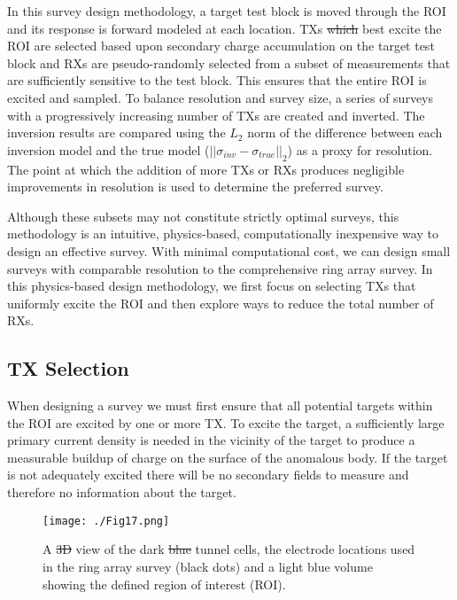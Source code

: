 \documentclass[preprint,authoryear,12pt]{elsarticle}
\providecommand{\DIFaddtex}[1]{{\protect\color{blue}\uwave{#1}}} %
\providecommand{\DIFdeltex}[1]{{\protect\color{red}\sout{#1}}}                      %
\providecommand{\DIFaddbegin}{} %
\providecommand{\DIFaddend}{} %
\providecommand{\DIFdelbegin}{} %
\providecommand{\DIFdelend}{} %
\providecommand{\DIFaddFL}[1]{\DIFadd{#1}} %
\providecommand{\DIFdelFL}[1]{\DIFdel{#1}} %
\providecommand{\DIFaddbeginFL}{} %
\providecommand{\DIFaddendFL}{} %
\providecommand{\DIFdelbeginFL}{} %
\providecommand{\DIFdelendFL}{} %
\providecommand{\DIFadd}[1]{\texorpdfstring{\DIFaddtex{#1}}{#1}} %
\providecommand{\DIFdel}[1]{\texorpdfstring{\DIFdeltex{#1}}{}} %
\begin{document}
In this survey design methodology, a target test block is moved through the ROI and its response is forward modeled at each location. TXs \DIFdelbegin \DIFdel{which }\DIFdelend \DIFaddbegin \DIFadd{that }\DIFaddend best excite the ROI are selected based upon secondary charge accumulation on the target test block and RXs are pseudo-randomly selected from a subset of measurements that are sufficiently sensitive to the test block. This \DIFaddbegin \DIFadd{survey design methodology }\DIFaddend ensures that the entire ROI is excited and sampled. To balance resolution and survey size, a series of surveys with a progressively increasing number of TXs are created and inverted. The inversion results are compared using the $L_2$ norm of the difference between each inversion model and the true model ($\left|| \sigma_{inv} - \sigma_{true} \right||_2$) as a proxy for resolution. The point at which the addition of more TXs or RXs produces negligible improvements in resolution is used to determine the preferred survey.

Although these subsets may not constitute strictly optimal surveys, this methodology is an intuitive, physics-based, computationally inexpensive way to design an effective survey. With minimal computational cost, we can design small surveys with comparable resolution to the comprehensive ring array survey. In this physics-based design methodology, we first focus on selecting TXs that uniformly excite the ROI and then explore ways to reduce the total number of RXs.

\subsection{TX Selection}
\label{sec:RingArray_SurveyDesign_TXSelection}

When designing a survey we must first ensure that all potential targets within the ROI are excited by one or more TX. To excite the target, a sufficiently large primary current density is needed in the vicinity of the target to produce a measurable buildup of charge on the surface of the anomalous body. If the target is not adequately excited there will be no secondary fields to measure and therefore no information about the target.

\begin{figure}[htp]
   \begin{center}
      \DIFdelbeginFL %
\DIFdelendFL \DIFaddbeginFL \texttt{[image: ./Fig17.png]}
   \DIFaddendFL \end{center}
\caption{A \DIFdelbeginFL \DIFdelFL{3D }\DIFdelendFL \DIFaddbeginFL \DIFaddFL{3-D }\DIFaddendFL view of the dark \DIFdelbeginFL \DIFdelFL{blue }\DIFdelendFL \DIFaddbeginFL \DIFaddFL{purple }\DIFaddendFL tunnel cells, the electrode locations used in the ring array survey (black dots) and a light blue volume showing the defined region of interest (ROI).}
\label{fig:SurveyDesign_StraightTunnel_ROI}
\end{figure}
\end{document}
